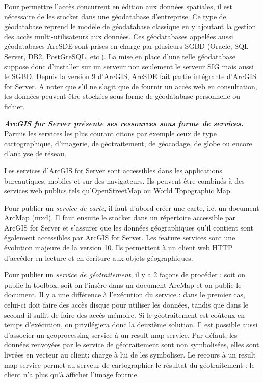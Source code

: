 \documentclass[11pt]{article}
\begin{document}
Pour permettre l'accès concurrent en édition aux données spatiales, il est nécessaire de les stocker dans une géodatabase d'entreprise. Ce type de géodatabase reprend le modèle de géodatabase classique en y ajoutant la gestion des accès multi-utilisateurs aux données. Ces géodatabases appelées aussi géodatabases ArcSDE sont prises en charge par plusieurs SGBD (Oracle, SQL Server, DB2, PostGreSQL, etc.). La mise en place d'une telle géodatabase suppose donc d'installer sur un serveur non seulement le serveur SIG mais aussi le SGBD. Depuis la version 9 d'ArcGIS, ArcSDE fait partie intégrante d'ArcGIS for Server. A noter que s'il ne s'agit que de fournir un accès web en consultation, les données peuvent être stockées sous forme de géodatabase personnelle ou fichier.
\vspace{2em}

\textbf{\emph{ArcGIS for Server présente ses ressources sous forme de services.}} Parmis les services les plus courant citons par exemple ceux de type cartographique, d'imagerie, de géotraitement, de géocodage, de globe ou encore d'analyse de réseau.

Les services d'ArcGIS for Server sont accessibles dans les applications bureautiques, mobiles et sur des navigateurs. Ils peuvent être combinés à des services web publics tels qu'OpenStreetMap ou World Topographic Map.

Pour publier un \textit{service de carte}, il faut d'abord créer une carte, i.e. un document ArcMap (mxd). Il faut ensuite le stocker dans un répertoire accessible par ArcGIS for Server et s'assurer que les données géographiques qu'il contient sont également accessibles par ArcGIS for Server.
Les feature services sont une évolution majeure de la version 10. Ils permettent à un client web HTTP d'accéder en lecture et en écriture aux objets géographiques.

Pour publier un \textit{service de géotraitement}, il y a 2 façons de procéder : soit on publie la toolbox,  soit on l'insère dans un document ArcMap et on publie le document. Il y a une différence à l'exécution du service : dans le premier cas, celui-ci doit faire des accès disque pour utiliser les données, tandis que dans le second il suffit de faire des accès mémoire. Si le géotraitement est coûteux en temps d'exécution, on privilégiera donc la deuxième solution. Il est possible aussi d'associer un geoprocessing service à un result map service. Par défaut, les données renvoyées par le service de géotraitement sont non symbolisées, elles sont livrées en vecteur au client: charge à lui de les symboliser. Le recours à un result map service permet au serveur de cartographier le résultat du géotraitement : le client n'a plus qu'à afficher l'image fournie.
\end{document}
